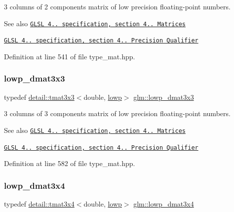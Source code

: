 3 columns of 2 components matrix of low precision floating-\/point numbers.

\begin{DoxySeeAlso}{See also}
\href{http://www.opengl.org/registry/doc/GLSLangSpec.4.20.8.pdf}{\tt G\+L\+SL 4.. specification, section 4.. Matrices} 

\href{http://www.opengl.org/registry/doc/GLSLangSpec.4.20.8.pdf}{\tt G\+L\+SL 4.. specification, section 4.. Precision Qualifier} 
\end{DoxySeeAlso}


Definition at line 541 of file type\+\_\+mat.\+hpp.

\mbox{\label{group__core__precision_gaea1bc4ede38e1b904f01ff5ce59210ea}} 
\subsubsection{\texorpdfstring{lowp\+\_\+dmat3x3}{lowp\_dmat3x3}}
{\footnotesize\ttfamily typedef \hyperlink{structglm_1_1detail_1_1tmat3x3}{detail\+::tmat3x3}$<$double, \hyperlink{namespaceglm_a0f04f086094c747d227af4425893f545ae161af3fc695e696ce3bf69f7332bc2d}{lowp}$>$ \hyperlink{group__core__precision_gaea1bc4ede38e1b904f01ff5ce59210ea}{glm\+::lowp\+\_\+dmat3x3}}

3 columns of 3 components matrix of low precision floating-\/point numbers.

\begin{DoxySeeAlso}{See also}
\href{http://www.opengl.org/registry/doc/GLSLangSpec.4.20.8.pdf}{\tt G\+L\+SL 4.. specification, section 4.. Matrices} 

\href{http://www.opengl.org/registry/doc/GLSLangSpec.4.20.8.pdf}{\tt G\+L\+SL 4.. specification, section 4.. Precision Qualifier} 
\end{DoxySeeAlso}


Definition at line 582 of file type\+\_\+mat.\+hpp.

\mbox{\label{group__core__precision_ga4640e1d20ad705842525e79a4cc57b15}} 
\subsubsection{\texorpdfstring{lowp\+\_\+dmat3x4}{lowp\_dmat3x4}}
{\footnotesize\ttfamily typedef \hyperlink{structglm_1_1detail_1_1tmat3x4}{detail\+::tmat3x4}$<$double, \hyperlink{namespaceglm_a0f04f086094c747d227af4425893f545ae161af3fc695e696ce3bf69f7332bc2d}{lowp}$>$ \hyperlink{group__core__precision_ga4640e1d20ad705842525e79a4cc57b15}{glm\+::lowp\+\_\+dmat3x4}}

